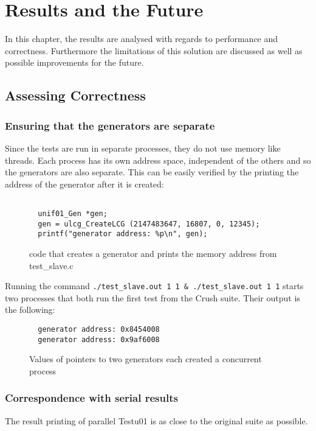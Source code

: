 \chapter{Results and the Future}
\label{cha:results}
In this chapter, the results are analysed with regards to performance and correctness. Furthermore the limitations of this solution are discussed as well as possible improvements for the future.

\section{Assessing Correctness}
\subsection{Ensuring that the generators are separate}
Since the tests are run in separate processes, they do not use memory like threads. Each process has its own address space, independent of the others and so the generators are also separate. This can be easily verified by the printing the address of the generator after it is created:

\begin{figure}[h]
  \begin{verbatim}

  unif01_Gen *gen;
  gen = ulcg_CreateLCG (2147483647, 16807, 0, 12345);
  printf("generator address: %p\n", gen);

  \end{verbatim}
  \caption{code that creates a generator and prints the memory address from test\_slave.c}
  \label{fig:generator_address}
\end{figure}

Running the command \texttt{./test\_slave.out 1 1 \& ./test\_slave.out 1 1} starts two processes that both run the first test from the Crush suite. Their output is the following:

\begin{figure}[h]
  \begin{verbatim}
  generator address: 0x8454008
  generator address: 0x9af6008
  \end{verbatim}
  \caption{Values of pointers to two generators each created a concurrent process}
  \label{fig:generator_address_output}
\end{figure}

\subsection{Correspondence with serial results}
The result printing of parallel Testu01 is as close to the original suite as possible.

